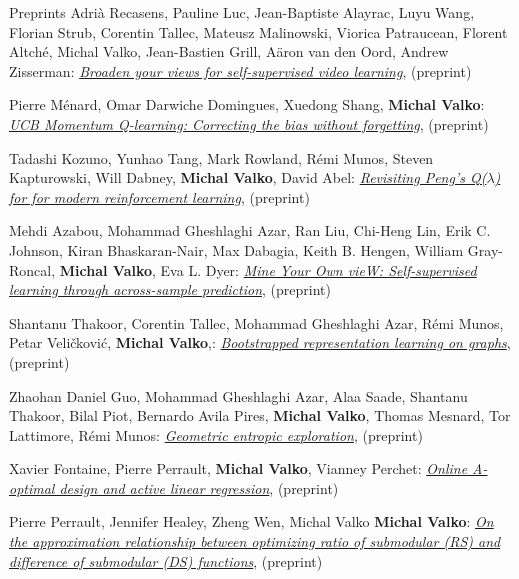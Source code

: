 \documentclass{resume}
\begin{document}
\begin{category}{Preprints}
\citembullet
Adri\`a Recasens, Pauline Luc, Jean-Baptiste Alayrac, Luyu Wang, Florian Strub, Corentin Tallec, Mateusz Malinowski, Viorica Patraucean, Florent Altch\' e, Michal Valko, Jean-Bastien Grill, A\"aron van den Oord, Andrew Zisserman: 
\href{https://arxiv.org/pdf/2103.16559}{\emph{Broaden your views for self-supervised video learning}},
({\sf preprint}) 

\citembullet
Pierre M\' enard,  Omar Darwiche Domingues, Xuedong Shang,  {\bf Michal Valko}:
\href{https://arxiv.org/pdf/2103.01312.pdf}{\emph{UCB Momentum Q-learning: Correcting the bias without forgetting}},
({\sf preprint}) 

\citembullet
Tadashi Kozuno, Yunhao Tang, Mark Rowland, R\' emi Munos, Steven Kapturowski, Will Dabney, {\bf Michal Valko}, David Abel: 
\href{https://arxiv.org/pdf/2103.00107.pdf}{\emph{Revisiting Peng's Q($\lambda$) for for modern reinforcement learning}},
({\sf preprint}) 

\citembullet
Mehdi Azabou, Mohammad Gheshlaghi Azar, Ran Liu, Chi-Heng Lin, Erik C. Johnson, Kiran Bhaskaran-Nair, Max Dabagia, Keith B. Hengen, William Gray-Roncal, {\bf Michal Valko}, Eva L. Dyer:
\href{https://arxiv.org/pdf/2102.10106.pdf}{\emph{Mine Your Own vieW: Self-supervised learning through across-sample prediction}},
({\sf preprint}) 

\citembullet
Shantanu Thakoor, Corentin Tallec, Mohammad Gheshlaghi Azar, R\' emi Munos, Petar Veličković, {\bf Michal Valko},:
\href{https://arxiv.org/pdf/2102.06514.pdf}{\emph{Bootstrapped representation learning on graphs}},
({\sf preprint}) 

\citembullet
Zhaohan Daniel Guo, Mohammad Gheshlaghi Azar, Alaa Saade, Shantanu Thakoor, Bilal Piot, Bernardo Avila Pires, {\bf Michal Valko}, Thomas Mesnard, Tor Lattimore, R\' emi Munos: 
\href{https://arxiv.org/pdf/2101.02055.pdf}{\emph{Geometric entropic exploration}},
({\sf preprint}) 

\citembullet
Xavier Fontaine, Pierre Perrault, {\bf Michal Valko}, Vianney Perchet:
\href{https://arxiv.org/pdf/1906.08509.pdf}{\emph{Online A-optimal design and active linear regression}},
 ({\sf preprint}) 

\citembullet
Pierre Perrault, Jennifer Healey, Zheng Wen, Michal Valko {\bf Michal Valko}: 
\href{https://arxiv.org/pdf/2101.01631.pdf}{\emph{On the approximation relationship between optimizing ratio of submodular (RS) and difference of submodular (DS) functions}},
 ({\sf preprint}) 


\end{category}
\end{document}
